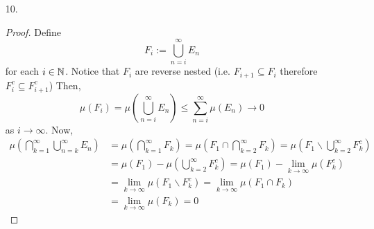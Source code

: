 \begin{itemize}
\item[10.] \label{q:w15-10}\begin{proof}
	Define
		\[ F_i := \bigcup_{n=i}^\infty E_n \]
	for each $i \in \mathbb{N}$. Notice that $F_i$ are reverse nested (i.e. $F_{i+1} \subseteq F_i$ therefore $F_i^c \subseteq F_{i+1}^c$) Then,
		\[ \mu(F_i) = \mu\left(\bigcup_{n=i}^\infty E_n \right) \le \sum_{n=i}^\infty \mu(E_n) \to 0 \]
	as $i \to \infty$. Now,
		\begin{align*}
			 \mu\left( \bigcap_{k=1}^\infty \bigcup_{n=k}^\infty E_n \right) &= \mu \left( \bigcap_{k=1}^\infty F_k \right) = \mu\left( F_1 \cap \bigcap_{k=2}^\infty F_k \right) = \mu\left( F_1 \backslash \bigcup_{k=2}^\infty F_k^c \right)\\
			&= \mu(F_1) - \mu\left(\bigcup_{k=2}^\infty F_k^c \right)= \mu(F_1) - \lim_{k\to\infty} \mu(F_k^c) \\[1mm]
			&= \lim_{k\to\infty} \mu(F_1\backslash F_k^c) = \lim_{k\to\infty}\mu(F_1 \cap F_k) \\[2mm]
			&= \lim_{k\to\infty}\mu(F_k) = 0
		\end{align*}
\end{proof}
\end{itemize}